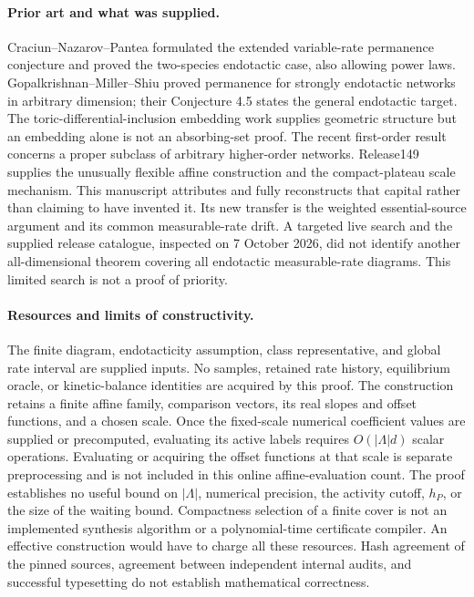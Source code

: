 \documentclass[11pt]{article}
\theoremstyle{definition}
\theoremstyle{remark}
\numberwithin{equation}{section}
\begin{document}
\paragraph{Prior art and what was supplied.}
Craciun--Nazarov--Pantea \cite{CNP2013} formulated the
extended variable-rate permanence conjecture and proved
the two-species endotactic case, also allowing power laws.
Gopalkrishnan--Miller--Shiu \cite{GMS2014} proved permanence
for strongly endotactic networks in arbitrary dimension;
their Conjecture 4.5 states the general endotactic target.
The toric-differential-inclusion embedding work
\cite{TDI2020} supplies geometric structure but an embedding
alone is not an absorbing-set proof. The recent
first-order result \cite{Xu2026} concerns a proper
subclass of arbitrary higher-order networks.
Release149 \cite{OAI149} supplies the unusually flexible
affine construction and the compact-plateau scale mechanism.
This manuscript attributes and fully reconstructs that
capital rather than claiming to have invented it. Its new
transfer is the weighted essential-source argument and its
common measurable-rate drift. A targeted live search and
the supplied release catalogue, inspected on 7 October
2026, did not identify another all-dimensional theorem
covering all endotactic measurable-rate diagrams. This
limited search is not a proof of priority.

\paragraph{Resources and limits of constructivity.}
The finite diagram, endotacticity assumption, class
representative, and global rate interval are supplied
inputs. No samples, retained rate history, equilibrium
oracle, or kinetic-balance identities are acquired by this
proof. The construction retains a finite affine family,
comparison vectors, its real slopes and offset functions,
and a chosen scale. Once the fixed-scale numerical coefficient
values are supplied or precomputed, evaluating its active labels
requires $O(|\Lambda|d)$ scalar operations. Evaluating or acquiring
the offset functions at that scale is separate preprocessing and
is not included in this online affine-evaluation count.
The proof establishes no useful bound on
$|\Lambda|$, numerical precision, the activity cutoff,
$h_P$, or the size of the waiting bound. Compactness
selection of a finite cover is not an implemented synthesis
algorithm or a polynomial-time certificate compiler.
An effective construction would have to charge all these
resources. Hash agreement of the pinned sources, agreement
between independent internal audits, and successful
typesetting do not establish mathematical correctness.
\end{document}
